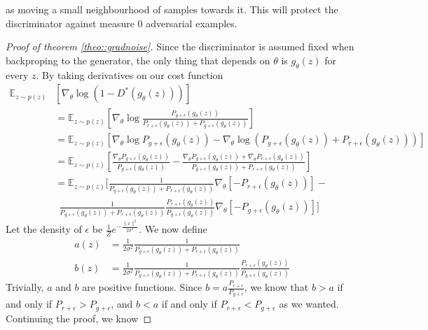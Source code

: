 \documentclass{article} %
\newcommand\EE{\mathbb{E}}
\theoremstyle{definition}
\begin{document}
as moving a small neighbourhood of samples towards it. This will protect the 
discriminator against measure 0 adversarial examples.
\begin{proof}[Proof of theorem \autoref{theo::gradnoise}]
Since the discriminator is assumed fixed when backproping to the generator, the only thing
that depends on $\theta$ is $g_\theta(z)$ for every $z$. By taking derivatives on our cost function
\begin{align*}
\EE_{z \sim p(z)} &\left[ \nabla_\theta \log(1 - D^*(g_\theta(z))) \right] \\
  &= \EE_{z \sim p(z)} \left[ \nabla_\theta \log \frac{P_{g+\epsilon}(g_\theta(z))}
    {P_{r+\epsilon}(g_\theta(z)) + P_{g+ \epsilon}(g_\theta(z))}\right] \\
  &= \EE_{z \sim p(z)} \left[ \nabla_\theta \log P_{g + \epsilon}(g_\theta(z))  -
    \nabla_\theta \log \left(P_{g + \epsilon}(g_\theta(z)) + P_{r + \epsilon}(g_\theta(z))
    \right)\right] \\
  &= \EE_{z \sim p(z)} \left[ \frac{\nabla_\theta P_{g + \epsilon}
    (g_\theta(z)) }{P_{g+ \epsilon}(g_\theta(z))} - \frac{\nabla_\theta P_{g + \epsilon}
    (g_\theta(z)) + \nabla_\theta P_{r + \epsilon}(g_\theta(z))}
    {P_{g + \epsilon}(g_\theta(z)) + P_{r + \epsilon}(g_\theta(z))}\right] \\
  &= \EE_{z \sim p(z)} \bigg[ \frac{1}{P_{g+\epsilon}(g_\theta(z))+ P_{r + \epsilon}
    (g_\theta(z))} \nabla_\theta[- P_{r + \epsilon}(g_\theta(z))] -  \\
    &\ \ \frac{1}{P_{g+\epsilon}(g_\theta(z))+ P_{r + \epsilon}(g_\theta(z))}
    \frac{P_{r + \epsilon}(g_\theta(z))}{P_{g + \epsilon}(g_\theta(z))} \nabla_\theta[
    -P_{g + \epsilon}(g_\theta(z))] \bigg]
\end{align*}
Let the density of $\epsilon$ be $\frac{1}{Z} e^{-\frac{\|x\|^2}{2\sigma^2}}$. 
We now define
\begin{align*}
a(z) &= \frac{1}{2\sigma^2}\frac{1}{P_{g+\epsilon}(g_\theta(z))+ P_{r + \epsilon}(g_\theta(z))} \\
b(z) &= \frac{1}{2\sigma^2}\frac{1}{P_{g+\epsilon}(g_\theta(z))+ P_{r + \epsilon}(g_\theta(z))}
    \frac{P_{r + \epsilon}(g_\theta(z))}{P_{g + \epsilon}(g_\theta(z))}
\end{align*}
Trivially, $a$ and $b$ are positive functions. Since
$b = a \frac{P_{r+\epsilon}}{P_{g+\epsilon}}$, we know that $b > a$ if and only if
$P_{r+\epsilon} > P_{g + \epsilon}$, and $b < a$ if and
only if $P_{r+\epsilon} < P_{g + \epsilon}$ as we wanted. Continuing the proof, we know

\end{proof}
\end{document}
